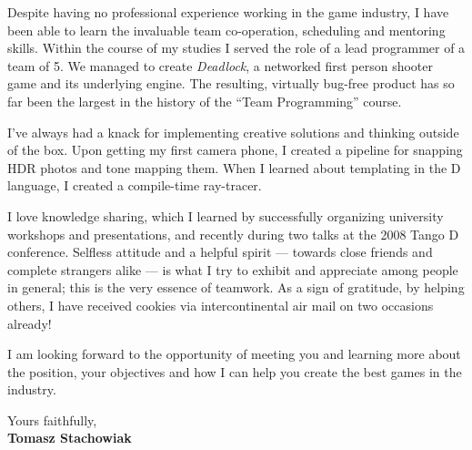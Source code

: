 \documentclass[11pt]{article}
\begin{document}
Despite having no professional experience working in the game industry, I have been able to learn the invaluable team co-operation, scheduling and mentoring skills. Within the course of my studies I served the role of a lead programmer of a team of 5. We managed to create \emph{Deadlock}, a networked first person shooter game and its underlying engine. The resulting, virtually bug-free product has so far been the largest in the history of the ``Team Programming'' course.

I've always had a knack for implementing creative solutions and thinking outside of the box. Upon getting my first camera phone, I created a pipeline for snapping HDR photos and tone mapping them. When I learned about templating in the D language, I created a compile-time ray-tracer.

I love knowledge sharing, which I learned by successfully organizing university workshops and presentations, and recently during two talks at the 2008 Tango D conference. Selfless attitude and a helpful spirit --- towards close friends and complete strangers alike --- is what I try to exhibit and appreciate among people in general; this is the very essence of teamwork. As a sign of gratitude, by helping others, I have received cookies via intercontinental air mail on two occasions already!

I am looking forward to the opportunity of meeting you and learning more about the position, your objectives and how I can help you create the best games in the industry.


Yours faithfully,\\[2em] %
%
{\bfseries Tomasz Stachowiak}
%
\end{document}

